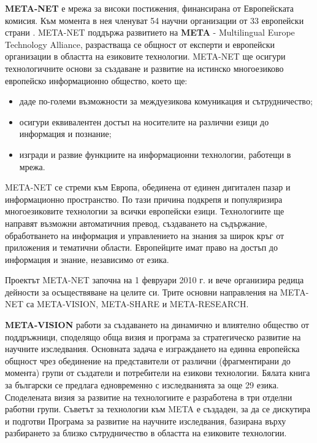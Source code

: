   \begin{multicols}{2}

    \textbf{META-NET} е мрежа за високи постижения, финансирана от Европейската
    комисия. Към момента в нея членуват 54 научни организации от 33 европейски страни \cite{rehm2011}. META-NET поддържа развитието
    на \textbf{META}  - Multilingual Europe Technology Alliance, разрастваща се общност от експерти и
    европейски организации в областта на езиковите
    технологии. META-NET ще осигури  технологичните основи за създаване и развитие на истинско многоезиково европейско информационно общество, което ще:

  \begin{itemize}
  \item даде по-големи възможности за междуезикова комуникация и сътрудничество;
  \item осигури еквивалентен достъп на носителите на различни езици до информация и познание;
  \item изгради и развие функциите на информационни технологии, работещи в мрежа.
  \end{itemize}

META-NET  се стреми към Европа, обединена от единен дигитален пазар и информационно пространство. По тази причина подкрепя и популяризира многоезиковите технологии за всички
  европейски езици. Технологиите ще направят възможни автоматичния
  превод, създаването на съдържание, обработването на информация и
  управлението на знания за широк кръг от приложения и тематични
  области.  Европейците
  имат право на достъп до информация и знание, независимо от езика.

  Проектът META-NET започна на 1 февруари 2010 г.  и вече организира редица дейности  за осъществяване на целите си. Трите основни направления на META-NET
  са META-VISION, META-SHARE и META-RESEARCH.

  \textbf{META-VISION} работи за създаването на динамично и влиятелно
  общество от поддръжници, споделящо обща визия и програма за
  стратегическо развитие на научните изследвания. Основната задача е
  изграждането на единна европейска общност чрез обединение на
  представители от различни (фрагментирани до момента) групи от
  създатели и потребители на езикови технологии. Бялата книга за български се предлага едновременно с  изследванията за още 29 езика. Споделената визия за развитие на технологиите е разработена в три отделни работни групи. Съветът за технологии към META е създаден, за да се дискутира и подготви Програма за развитие на научните изследвания, базирана върху разбирането за близко сътрудничество в областта на езиковите технологии.


\end{multicols}

